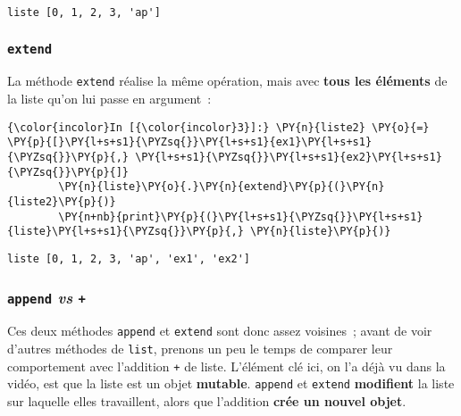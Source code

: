     \begin{Verbatim}[commandchars=\\\{\},frame=single,framerule=0.3mm,rulecolor=\color{cellframecolor}]
liste [0, 1, 2, 3, 'ap']
\end{Verbatim}

    \hypertarget{extend}{%
\subsubsection{\texorpdfstring{\texttt{extend}}{extend}}\label{extend}}

    La méthode \texttt{extend} réalise la même opération, mais avec
\textbf{tous les éléments} de la liste qu'on lui passe en argument~:

    \begin{Verbatim}[commandchars=\\\{\},frame=single,framerule=0.3mm,rulecolor=\color{cellframecolor}]
{\color{incolor}In [{\color{incolor}3}]:} \PY{n}{liste2} \PY{o}{=} \PY{p}{[}\PY{l+s+s1}{\PYZsq{}}\PY{l+s+s1}{ex1}\PY{l+s+s1}{\PYZsq{}}\PY{p}{,} \PY{l+s+s1}{\PYZsq{}}\PY{l+s+s1}{ex2}\PY{l+s+s1}{\PYZsq{}}\PY{p}{]}
        \PY{n}{liste}\PY{o}{.}\PY{n}{extend}\PY{p}{(}\PY{n}{liste2}\PY{p}{)}
        \PY{n+nb}{print}\PY{p}{(}\PY{l+s+s1}{\PYZsq{}}\PY{l+s+s1}{liste}\PY{l+s+s1}{\PYZsq{}}\PY{p}{,} \PY{n}{liste}\PY{p}{)}
\end{Verbatim}


    \begin{Verbatim}[commandchars=\\\{\},frame=single,framerule=0.3mm,rulecolor=\color{cellframecolor}]
liste [0, 1, 2, 3, 'ap', 'ex1', 'ex2']
\end{Verbatim}

    \hypertarget{append-vs}{%
\subsubsection{\texorpdfstring{\texttt{append} \emph{vs}
\texttt{+}}{append vs +}}\label{append-vs}}

    Ces deux méthodes \texttt{append} et \texttt{extend} sont donc assez
voisines~; avant de voir d'autres méthodes de \texttt{list}, prenons un
peu le temps de comparer leur comportement avec l'addition \texttt{+} de
liste. L'élément clé ici, on l'a déjà vu dans la vidéo, est que la liste
est un objet \textbf{mutable}. \texttt{append} et \texttt{extend}
\textbf{modifient} la liste sur laquelle elles travaillent, alors que
l'addition \textbf{crée un nouvel objet}.

